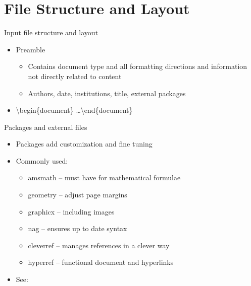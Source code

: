 \documentclass[11pt]{beamer}
\begin{document}
%
%
\section{File Structure and Layout}
\begin{frame}{Input file structure and layout}
\begin{itemize}
	\item<1->	Preamble
	\begin{itemize}
		\item	Contains document type and all formatting directions and information not directly related to content
		\item Authors, date, institutions, title, external packages \\
		\only<1->{\VerbatimInput{header_example.tex}}
	\end{itemize}
	\item<2> \textbackslash begin\{document\} \ldots \textbackslash end\{document\}
\end{itemize}
\end{frame}

%
%
\begin{frame}{Packages and external files}
\begin{itemize}
	\item Packages add customization and fine tuning
	\item Commonly used:
	\begin{itemize}
		\item amsmath -- must have for mathematical formulae
		\item geometry -- adjust page margins
		\item graphicx -- including images
		\item nag -- ensures up to date syntax
		\item cleverref -- manages references in a clever way
		\item hyperref -- functional document and hyperlinks
	\end{itemize}
	\item See: \href{http://www.howtotex.com/packages/9-essential-latex-packages-everyone-should-use/}{{\small \color{blue}{http://www.howtotex.com/packages/9-essential-latex-packages-everyone-should-use/}}}
\end{itemize}
\end{frame}

%
%
\end{document}
